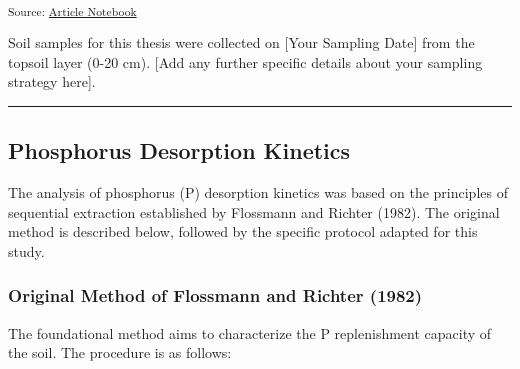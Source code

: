 \documentclass[
  a4paper,
]{article}
\begin{document}
\textsubscript{Source:
\href{https://Andrapodon.github.io/Master-Thesis-P-kinetics/index.qmd.html}{Article
Notebook}}

Soil samples for this thesis were collected on {[}Your Sampling Date{]}
from the topsoil layer (0-20 cm). {[}Add any further specific details
about your sampling strategy here{]}.

\begin{center}\rule{0.5\linewidth}{0.5pt}\end{center}

\subsection{Phosphorus Desorption
Kinetics}\label{phosphorus-desorption-kinetics}

The analysis of phosphorus (P) desorption kinetics was based on the
principles of sequential extraction established by Flossmann and Richter
(1982). The original method is described below, followed by the specific
protocol adapted for this study.

\subsubsection{Original Method of Flossmann and Richter
(1982)}\label{original-method-of-flossmann-and-richter-1982}

The foundational method aims to characterize the P replenishment
capacity of the soil. The procedure is as follows:
\end{document}
